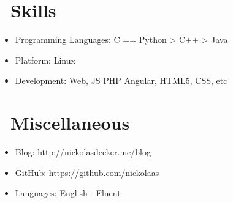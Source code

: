 \documentclass{resume}
\begin{document}
\section{\faCogs\ Skills}
\begin{itemize}[parsep=0.5ex]
  \item Programming Languages: C == Python > C++ > Java
  \item Platform: Linux
  \item Development: Web, JS PHP Angular, HTML5, CSS, etc
\end{itemize}


\section{\faInfo\ Miscellaneous}
\begin{itemize}[parsep=0.5ex]
  \item Blog: http://nickolasdecker.me/blog
  \item GitHub: https://github.com/nickolaas
  \item Languages: English - Fluent
\end{itemize}

%
%
\end{document}
